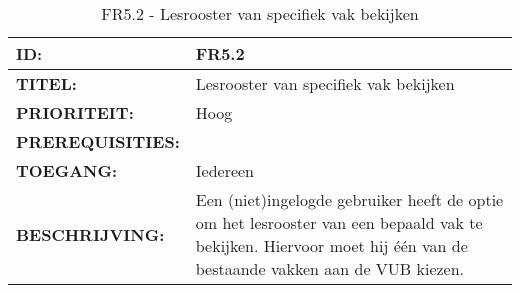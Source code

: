 \noindent\begin{table}[H]
            \begin{tabular}{l | p{10cm}}
                \textbf{ID:} & FR5.2 \\ \hline
                \textbf{TITEL:} & Lesrooster van specifiek vak bekijken \\ \hline
                \textbf{PRIORITEIT:} &  Hoog \\ \hline
                \textbf{PREREQUISITIES:} & \\ \hline
                \textbf{TOEGANG:} &  Iedereen \\ \hline
                \textbf{BESCHRIJVING:} & Een (niet)ingelogde gebruiker heeft de optie om het lesrooster van een bepaald vak te bekijken. 
                                        Hiervoor moet hij \'{e}\'{e}n van de bestaande vakken aan de VUB kiezen.\\
            \end{tabular}\\
            \caption{FR5.2 - Lesrooster van specifiek vak bekijken}
            \label{tab:FR5.2 - Lesrooster van specifiek vak bekijken}
        \end{table}

